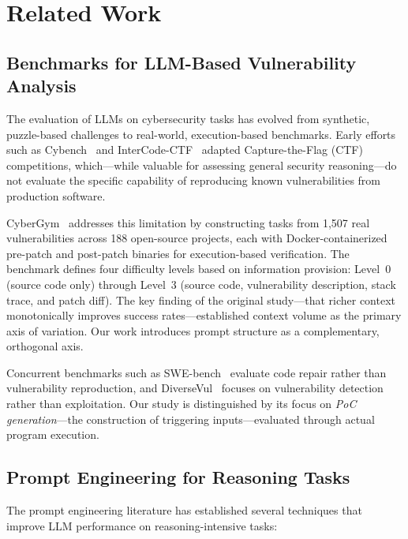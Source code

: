 \documentclass{ieeeaccess}
\begin{document}
\section{Related Work}
\label{sec:related_work}

\subsection{Benchmarks for LLM-Based Vulnerability Analysis}

The evaluation of LLMs on cybersecurity tasks has evolved from synthetic, puzzle-based challenges to real-world, execution-based benchmarks. Early efforts such as Cybench~\cite{cybench} and InterCode-CTF~\cite{intercode_ctf} adapted Capture-the-Flag (CTF) competitions, which---while valuable for assessing general security reasoning---do not evaluate the specific capability of reproducing known vulnerabilities from production software.

CyberGym~\cite{cybergym} addresses this limitation by constructing tasks from 1,507 real vulnerabilities across 188 open-source projects, each with Docker-containerized pre-patch and post-patch binaries for execution-based verification. The benchmark defines four difficulty levels based on information provision: Level~0 (source code only) through Level~3 (source code, vulnerability description, stack trace, and patch diff). The key finding of the original study---that richer context monotonically improves success rates---established context volume as the primary axis of variation. Our work introduces prompt structure as a complementary, orthogonal axis.

Concurrent benchmarks such as SWE-bench~\cite{swe_bench} evaluate code repair rather than vulnerability reproduction, and DiverseVul~\cite{diversevul} focuses on vulnerability detection rather than exploitation. Our study is distinguished by its focus on \emph{PoC generation}---the construction of triggering inputs---evaluated through actual program execution.

\subsection{Prompt Engineering for Reasoning Tasks}

The prompt engineering literature has established several techniques that improve LLM performance on reasoning-intensive tasks:
\end{document}

